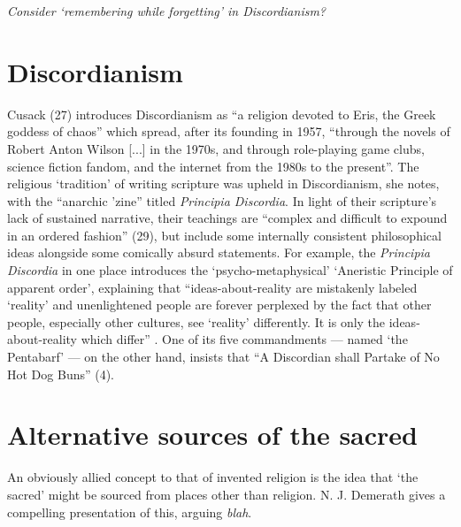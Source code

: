 \documentclass[Draft.tex]{subfiles}
\begin{document}
\textit{Consider `remembering while forgetting' in Discordianism?}

\section*{Discordianism}
Cusack (27) introduces Discordianism as
``a religion devoted to Eris, the Greek goddess of chaos''
which spread, after its founding in 1957, ``through
the novels of Robert Anton Wilson [...] in the 1970s,
and through role-playing game clubs, science fiction fandom,
and the internet from the 1980s to the present''.
The religious `tradition' of writing scripture was upheld in Discordianism,
she notes, with the ``anarchic 'zine'' titled \textit{Principia Discordia}.
In light of their scripture's lack of sustained narrative, their teachings
are ``complex and difficult to expound in an ordered fashion'' (29),
but include some internally consistent philosophical ideas
alongside some comically absurd statements.
For example, the \textit{Principia Discordia} in one place introduces the
`psycho-metaphysical' `Aneristic Principle of apparent order',
explaining that ``ideas-about-reality are mistakenly labeled `reality'
and unenlightened people are forever perplexed by the fact that
other people, especially other cultures, see `reality' differently.
It is only the ideas-about-reality which differ'' \parencite[49]{Principia}.
One of its five commandments --- named `the Pentabarf' ---
on the other hand, insists that
``A Discordian shall Partake of No Hot Dog Buns'' (4).


\section*{Alternative sources of the sacred}
An obviously allied concept to that of invented religion
is the idea that `the sacred' might be sourced
from places other than religion.
N. J. Demerath \parencite*{Demerath00} gives a compelling presentation
of this, arguing \textit{blah}.
\end{document}
